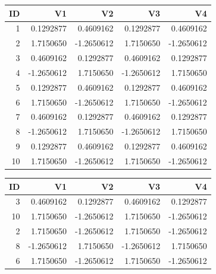 \documentclass[
]{book}
\newenvironment{Shaded}{\begin{snugshade}}{\end{snugshade}}
\newcommand{\KeywordTok}[1]{\textcolor[rgb]{0.13,0.29,0.53}{\textbf{#1}}}
\newcommand{\NormalTok}[1]{#1}
\newcommand{\OperatorTok}[1]{\textcolor[rgb]{0.81,0.36,0.00}{\textbf{#1}}}
\newcommand{\StringTok}[1]{\textcolor[rgb]{0.31,0.60,0.02}{#1}}
\begin{document}
\begin{table}[!h]
\centering
\begin{tabular}{r|r|r|r|r}
\hline
ID & V1 & V2 & V3 & V4\\
\hline
\rowcolor{gray!6}  1 & 0.1292877 & 0.4609162 & 0.1292877 & 0.4609162\\
\hline
2 & 1.7150650 & -1.2650612 & 1.7150650 & -1.2650612\\
\hline
\rowcolor{gray!6}  3 & 0.4609162 & 0.1292877 & 0.4609162 & 0.1292877\\
\hline
4 & -1.2650612 & 1.7150650 & -1.2650612 & 1.7150650\\
\hline
\rowcolor{gray!6}  5 & 0.1292877 & 0.4609162 & 0.1292877 & 0.4609162\\
\hline
6 & 1.7150650 & -1.2650612 & 1.7150650 & -1.2650612\\
\hline
\rowcolor{gray!6}  7 & 0.4609162 & 0.1292877 & 0.4609162 & 0.1292877\\
\hline
8 & -1.2650612 & 1.7150650 & -1.2650612 & 1.7150650\\
\hline
\rowcolor{gray!6}  9 & 0.1292877 & 0.4609162 & 0.1292877 & 0.4609162\\
\hline
10 & 1.7150650 & -1.2650612 & 1.7150650 & -1.2650612\\
\hline
\end{tabular}
\end{table}

\begin{Shaded}
\end{Shaded}

\begin{table}[!h]
\centering
\begin{tabular}{r|r|r|r|r}
\hline
ID & V1 & V2 & V3 & V4\\
\hline
\rowcolor{gray!6}  3 & 0.4609162 & 0.1292877 & 0.4609162 & 0.1292877\\
\hline
10 & 1.7150650 & -1.2650612 & 1.7150650 & -1.2650612\\
\hline
\rowcolor{gray!6}  2 & 1.7150650 & -1.2650612 & 1.7150650 & -1.2650612\\
\hline
8 & -1.2650612 & 1.7150650 & -1.2650612 & 1.7150650\\
\hline
\rowcolor{gray!6}  6 & 1.7150650 & -1.2650612 & 1.7150650 & -1.2650612\\
\hline
\end{tabular}
\end{table}
\end{document}

